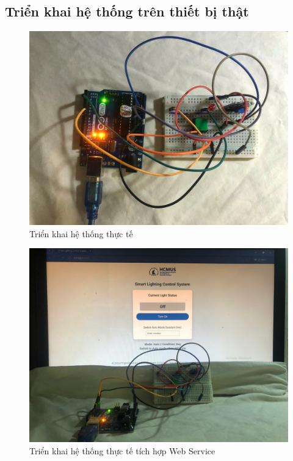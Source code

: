 {\subsection{Triển khai hệ thống trên thiết bị thật}
\begin{figure}[H]
    \centering
    \includegraphics[scale=0.12]{img/realSystem.jpg}
    \caption{Triển khai hệ thống thực tế}
    \label{fig:real_1}
\end{figure}

\begin{figure}[H]
    \centering
    \includegraphics[scale=0.12]{img/SystemWeb.jpg}
    \caption{Triển khai hệ thống thực tế tích hợp Web Service}
    \label{fig:real_2}
\end{figure}

}
